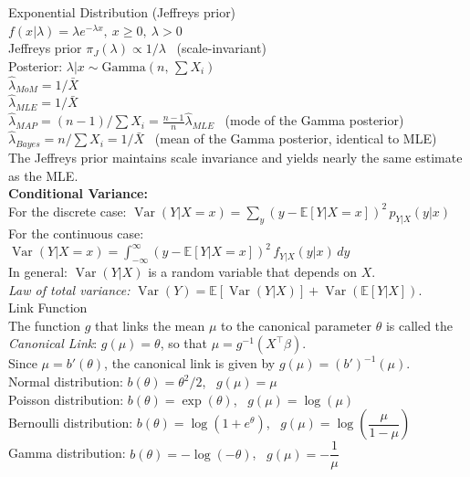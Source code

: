 Exponential Distribution (Jeffreys prior)\\
$f(x|\lambda) = \lambda e^{-\lambda x}, \ x \ge 0, \ \lambda > 0$\\
Jeffreys prior $\pi_J(\lambda) \propto 1/\lambda$ \ (scale-invariant)\\
Posterior: $\lambda | x \sim \text{Gamma}(n,\, \sum X_i)$\\
$\hat{\lambda}_{MoM} = 1/\bar{X}$\\
$\hat{\lambda}_{MLE} = 1/\bar{X}$\\
$\hat{\lambda}_{MAP} = (n - 1)/\sum X_i = \tfrac{n - 1}{n}\hat{\lambda}_{MLE}$ \ (mode of the Gamma posterior)\\
$\hat{\lambda}_{Bayes} = n / \sum X_i = 1/\bar{X}$ \ (mean of the Gamma posterior, identical to MLE)\\
The Jeffreys prior maintains scale invariance and yields nearly the same estimate as the MLE.\\

\textbf{Conditional Variance:}\\
For the discrete case: $\operatorname{Var}(Y|X=x) = \sum_y (y - \mathbb{E}[Y|X=x])^2 \, p_{Y|X}(y|x)$\\
For the continuous case: $\operatorname{Var}(Y|X=x) = \int_{-\infty}^{\infty} (y - \mathbb{E}[Y|X=x])^2 \, f_{Y|X}(y|x)\,dy$\\
In general: $\operatorname{Var}(Y|X)$ is a random variable that depends on $X$.\\
\textit{Law of total variance:} $\operatorname{Var}(Y) = \mathbb{E}[\operatorname{Var}(Y|X)] + \operatorname{Var}(\mathbb{E}[Y|X])$.\\

Link Function\\
The function $g$ that links the mean $\mu$ to the canonical parameter $\theta$ is called the \textit{Canonical Link}: $g(\mu) = \theta$, so that $\mu = g^{-1}(X^\top \beta)$.\\
Since $\mu = b'(\theta)$, the canonical link is given by $g(\mu) = (b')^{-1}(\mu)$.\\
Normal distribution: $b(\theta) = \theta^2/2$, \ $g(\mu) = \mu$\\
Poisson distribution: $b(\theta) = \exp(\theta)$, \ $g(\mu) = \log(\mu)$\\
Bernoulli distribution: $b(\theta) = \log(1 + e^\theta)$, \ $g(\mu) = \log\!\left(\dfrac{\mu}{1 - \mu}\right)$\\
Gamma distribution: $b(\theta) = -\log(-\theta)$, \ $g(\mu) = -\dfrac{1}{\mu}$\\


